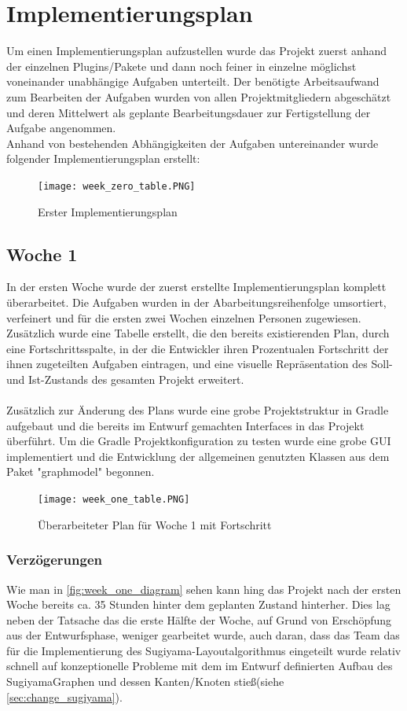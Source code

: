 \chapter{Implementierungsplan}
\label{ch:implplan}
Um einen Implementierungsplan aufzustellen wurde das Projekt zuerst anhand der einzelnen Plugins/Pakete und dann noch feiner in einzelne möglichst voneinander unabhängige Aufgaben unterteilt. Der benötigte Arbeitsaufwand zum Bearbeiten der Aufgaben wurden von allen Projektmitgliedern abgeschätzt und deren Mittelwert als geplante Bearbeitungsdauer zur Fertigstellung der Aufgabe angenommen.\\
Anhand von bestehenden Abhängigkeiten der Aufgaben untereinander wurde folgender Implementierungsplan erstellt:\\ 
\begin{figure}[!htbp]
	\centering
	\texttt{[image: week\_zero\_table.PNG]}
	\caption{Erster Implementierungsplan}
	\label{fig:week_zero_table}
\end{figure}
\newpage
\section{Woche 1}
In der ersten Woche wurde der zuerst erstellte Implementierungsplan komplett überarbeitet. Die Aufgaben wurden in der Abarbeitungsreihenfolge umsortiert, verfeinert und für die ersten zwei Wochen einzelnen Personen zugewiesen. Zusätzlich wurde eine Tabelle erstellt, die den bereits existierenden Plan, durch eine Fortschrittsspalte, in der die Entwickler ihren Prozentualen Fortschritt der ihnen zugeteilten Aufgaben eintragen, und eine visuelle Repräsentation des Soll- und Ist-Zustands des gesamten Projekt erweitert.\\
\\
Zusätzlich zur Änderung des Plans wurde eine grobe Projektstruktur in Gradle aufgebaut und die bereits im Entwurf gemachten Interfaces in das Projekt überführt. Um die Gradle Projektkonfiguration zu testen wurde eine grobe GUI implementiert und die Entwicklung der allgemeinen genutzten Klassen aus dem Paket "graphmodel"  begonnen.

\begin{figure}[!htbp]
	\centering
	\texttt{[image: week\_one\_table.PNG]}
	\caption{Überarbeiteter Plan für Woche 1 mit Fortschritt}
	\label{fig:week_one_table}
\end{figure}

\subsection{Verzögerungen}
Wie man in \ref{fig:week_one_diagram} sehen kann hing das Projekt nach der ersten Woche bereits ca. 35 Stunden hinter dem geplanten Zustand hinterher.
Dies lag neben der Tatsache das die erste Hälfte der Woche, auf Grund von Erschöpfung aus der Entwurfsphase, weniger gearbeitet wurde, auch daran, dass das Team das für die Implementierung des Sugiyama-Layoutalgorithmus eingeteilt wurde relativ schnell auf konzeptionelle Probleme mit dem im Entwurf definierten Aufbau des SugiyamaGraphen und dessen Kanten/Knoten stieß(siehe \ref{sec:change_sugiyama}).

